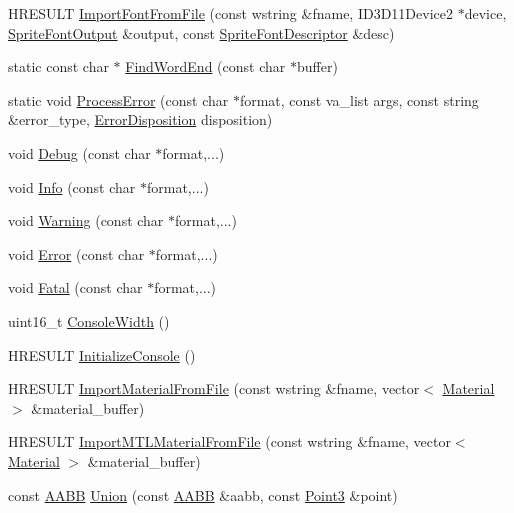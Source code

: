 \begin{DoxyCompactItemize}
H\+R\+E\+S\+U\+LT \hyperlink{namespacemage_afbf05d485686caef85c42be9625540b5}{Import\+Font\+From\+File} (const wstring \&fname, I\+D3\+D11\+Device2 $\ast$device, \hyperlink{structmage_1_1_sprite_font_output}{Sprite\+Font\+Output} \&output, const \hyperlink{structmage_1_1_sprite_font_descriptor}{Sprite\+Font\+Descriptor} \&desc)
\item 
static const char $\ast$ \hyperlink{namespacemage_a81ebde51f9da00dd6fad364a2c5017cb}{Find\+Word\+End} (const char $\ast$buffer)
\item 
static void \hyperlink{namespacemage_ab248f74af47acacc1306e875fb19a9ce}{Process\+Error} (const char $\ast$format, const va\+\_\+list args, const string \&error\+\_\+type, \hyperlink{namespacemage_a7146b3c3db53179eeb32bf4d51934715}{Error\+Disposition} disposition)
\item 
void \hyperlink{namespacemage_a1bcf1f0301e170105908eee5b5c46830}{Debug} (const char $\ast$format,...)
\item 
void \hyperlink{namespacemage_add6aa5f13960ce07b20f48d273956a91}{Info} (const char $\ast$format,...)
\item 
void \hyperlink{namespacemage_a0eccd8065c75d5f2bf86b48a5be3bfe5}{Warning} (const char $\ast$format,...)
\item 
void \hyperlink{namespacemage_a52a7fe8c9ce39afd9e0b0299373db0fa}{Error} (const char $\ast$format,...)
\item 
void \hyperlink{namespacemage_aefd40c91591a8e0423e4222b4a5e6249}{Fatal} (const char $\ast$format,...)
\item 
uint16\+\_\+t \hyperlink{namespacemage_a2988e0e46e373691a189ea97135f1ed1}{Console\+Width} ()
\item 
H\+R\+E\+S\+U\+LT \hyperlink{namespacemage_a14798232aabfdf96d751f4fcca4e6ece}{Initialize\+Console} ()
\item 
H\+R\+E\+S\+U\+LT \hyperlink{namespacemage_a3dd35a33d61f2891a717b5958f7edf12}{Import\+Material\+From\+File} (const wstring \&fname, vector$<$ \hyperlink{structmage_1_1_material}{Material} $>$ \&material\+\_\+buffer)
\item 
H\+R\+E\+S\+U\+LT \hyperlink{namespacemage_a7d8de4109ffc72a7a320e4ec642bddef}{Import\+M\+T\+L\+Material\+From\+File} (const wstring \&fname, vector$<$ \hyperlink{structmage_1_1_material}{Material} $>$ \&material\+\_\+buffer)
\item 
const \hyperlink{structmage_1_1_a_a_b_b}{A\+A\+BB} \hyperlink{namespacemage_a4d27bf7b1b0d30b747cdec1326e80907}{Union} (const \hyperlink{structmage_1_1_a_a_b_b}{A\+A\+BB} \&aabb, const \hyperlink{structmage_1_1_point3}{Point3} \&point)

\end{DoxyCompactItemize}
